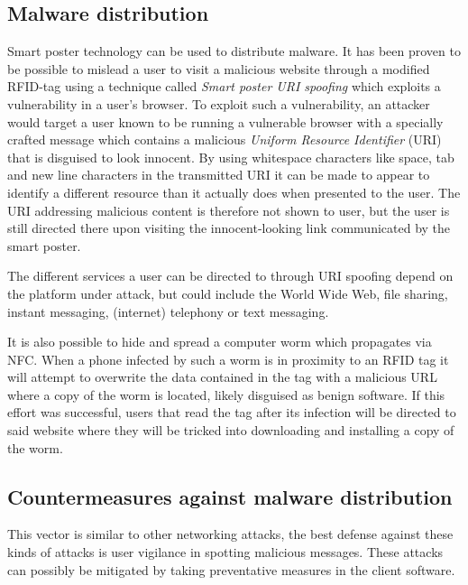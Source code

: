 \subsection{Malware distribution}
Smart poster technology can be used to distribute malware.
It has been proven to be possible to mislead a user to visit a malicious website through a modified RFID-tag using a technique called \textit{Smart poster URI spoofing} which exploits a vulnerability in a user's browser.
To exploit such a vulnerability, an attacker would target a user known to be running a vulnerable browser with a specially crafted message which contains a malicious \textit{Uniform Resource Identifier} (URI) that is disguised to look innocent.
By using whitespace characters like space, tab and new line characters in the transmitted URI it can be made to appear to identify a different resource than it actually does when presented to the user.
The URI addressing malicious content is therefore not shown to user, but the user is still directed there upon visiting the innocent-looking link communicated by the smart poster.
\cite{mulliner2009vulnerability}

The different services a user can be directed to through URI spoofing depend on the platform under attack, but could include the World Wide Web, file sharing, instant messaging, (internet) telephony or text messaging.

It is also possible to hide and spread a computer worm which propagates via NFC.
When a phone infected by such a worm is in proximity to an RFID tag it will attempt to overwrite the data contained in the tag with a malicious URL where a copy of the worm is located, likely disguised as benign software.
If this effort was successful, users that read the tag after its infection will be directed to said website where they will be tricked into downloading and installing a copy of the worm. \cite{rieback2006your}

\subsection{Countermeasures against malware distribution}
This vector is similar to other networking attacks, the best defense against these kinds of attacks is user vigilance in spotting malicious messages.
These attacks can possibly be mitigated by taking preventative measures in the client software.

